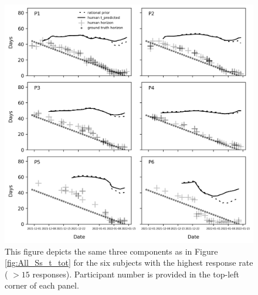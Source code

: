 \begin{figure}
    \centering
    \includegraphics[width=\linewidth]{Figures/Single_Subjects.png}
    \caption{
    This figure depicts the same three components as in Figure \ref{fig:All_Ss_t_tot} for the six subjects with the highest response rate ( $> 15$ responses). Participant number is provided in the top-left corner of each panel.
    }
    \label{fig:Single_Ss_t_tot}
\end{figure}


